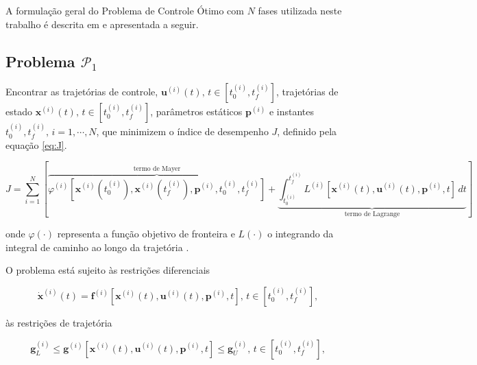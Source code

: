 A formulação geral do Problema de Controle Ótimo com $N$ fases utilizada neste trabalho é descrita em \cite{becerra_psopt_2022} e apresentada a seguir.

\subsection*{Problema $\mathcal{P}_1$}
\label{subsec:problema-1}

\noindent Encontrar as trajetórias de controle, $\mathbf{u}^{(i)}(t), \, t \in \left[ t_0^{(i)}, t_f^{(i)} \right]$, trajetórias de estado $\mathbf{x}^{(i)}(t), \, t \in \left[ t_0^{(i)}, t_f^{(i)} \right]$, parâmetros estáticos $\mathbf{p}^{(i)}$ e instantes $t_0^{(i)}, t_f^{(i)}, \, i = 1, \cdots, N$, que minimizem o índice de desempenho $J$, definido pela equação \ref{eq:J}.

\begin{equation}
    \label{eq:J}
    J = \sum_{i=1}^{N} \left[ 
        \overbrace{\varphi^{(i)} \left[ \mathbf{x}^{(i)} \left( t_0^{(i)} \right), \mathbf{x}^{(i)} \left( t_f^{(i)} \right), \mathbf{p}^{(i)}, t_0^{(i)}, t_f^{(i)} \right]}^{\text{termo de Mayer}}
        + \underbrace{\int_{t_0^{(i)}}^{t_f^{(i)}} L^{(i)} \left[ \mathbf{x}^{(i)}(t), \mathbf{u}^{(i)}(t), \mathbf{p}^{(i)}, t \right] \, dt}_{\text{termo de Lagrange}}
    \right]
\end{equation}

\noindent onde $\varphi(\cdot)$ representa a função objetivo de fronteira e $L(\cdot)$ o integrando da integral de caminho ao longo da trajetória \cite{kelly_introduction_2017}. 

\noindent O problema está sujeito às restrições diferenciais

\begin{equation}
\label{eq:restrições-diferenciais}
    \dot{\mathbf{x}}^{(i)}(t) = \mathbf{f}^{(i)} \left[ \mathbf{x}^{(i)}(t), \mathbf{u}^{(i)}(t), \mathbf{p}^{(i)}, t \right], \, t \in \left[ t_0^{(i)}, t_f^{(i)} \right],
\end{equation}

\noindent às restrições de trajetória

\begin{equation}
\label{eq:restrições-trajetória}
    \mathbf{g}_L^{(i)} \leq \mathbf{g}^{(i)} \left[ \mathbf{x}^{(i)}(t), \mathbf{u}^{(i)}(t), \mathbf{p}^{(i)}, t \right] \leq \mathbf{g}_U^{(i)}, \, t \in \left[ t_0^{(i)}, t_f^{(i)} \right],
\end{equation}

